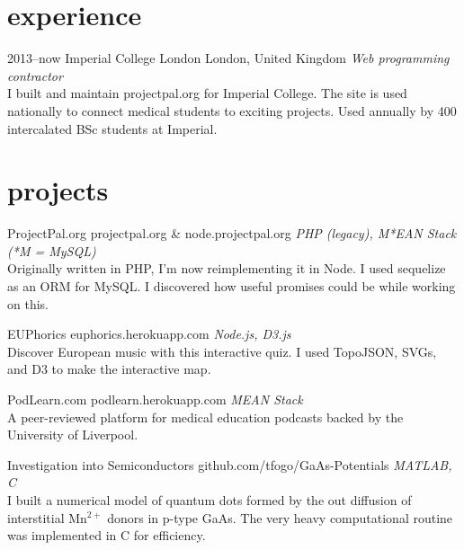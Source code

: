 \documentclass[]{friggeri-cv} %
\begin{document}
\section{\color{red}experience}

\begin{entrylist}
\entry
{2013--now}
{Imperial College London}
{London, United Kingdom}
{\emph{Web programming contractor} \\
I built and maintain projectpal.org for Imperial College. The site is used nationally to connect medical students to exciting projects. Used annually by 400 intercalated BSc students at Imperial.}
\end{entrylist}

\section{\color{orange}projects}

\begin{entrylist}
\entry
{}
{ProjectPal.org}
{projectpal.org \& node.projectpal.org}
{\emph{PHP (legacy), M*EAN Stack (*M = MySQL)} \\
Originally written in PHP, I'm now reimplementing it in Node. I used sequelize as an ORM for MySQL. I discovered how useful promises could be while working on this.}
\end{entrylist}

\begin{entrylist}
\entry
{}
{EUPhorics}
{euphorics.herokuapp.com}
{\emph{Node.js, D3.js} \\
Discover European music with this interactive quiz. I used TopoJSON, SVGs, and D3 to make the interactive map.}
\end{entrylist}

\begin{entrylist}
\entry
{}
{PodLearn.com}
{podlearn.herokuapp.com}
{\emph{MEAN Stack} \\
A peer-reviewed platform for medical education podcasts backed by the University of Liverpool.}
\end{entrylist}

\begin{entrylist}
\entry
{}
{Investigation into Semiconductors}
{github.com/tfogo/GaAs-Potentials}
{\emph{MATLAB, C} \\
I built a numerical model of quantum dots formed by the out diffusion of interstitial Mn$^{2+}$ donors in p-type GaAs. The very heavy computational routine was implemented in C for efficiency.}
\end{entrylist}
\end{document}
